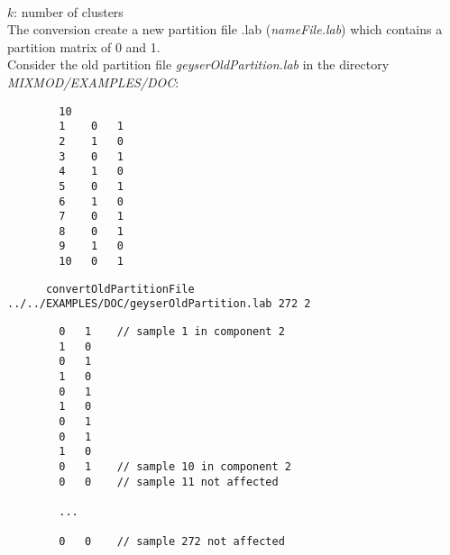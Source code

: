\\
$k$: number of clusters\\
The conversion create a new partition file .lab ({\em nameFile.lab}) which contains a partition matrix of 0 and
1.\\
Consider the old partition file {\em geyserOldPartition.lab} in the directory {\em MIXMOD/EXAMPLES/DOC}:
{\scriptsize
\begin{verbatim}
        10
        1    0   1
        2    1   0
        3    0   1
        4    1   0
        5    0   1
        6    1   0
        7    0   1
        8    0   1
        9    1   0
        10   0   1
\end{verbatim}}

{\scriptsize
\begin{verbatim}
      convertOldPartitionFile ../../EXAMPLES/DOC/geyserOldPartition.lab 272 2
\end{verbatim}}

{\scriptsize
\begin{verbatim}
        0   1    // sample 1 in component 2
        1   0
        0   1
        1   0
        0   1
        1   0
        0   1
        0   1
        1   0
        0   1    // sample 10 in component 2
        0   0    // sample 11 not affected

        ...

        0   0    // sample 272 not affected
\end{verbatim}}

\newpage
